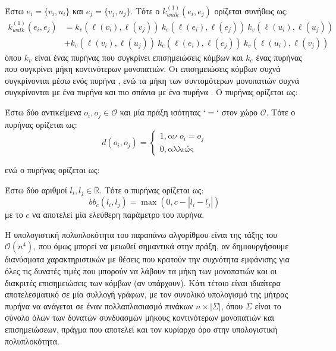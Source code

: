 Έστω $e_i = \{v_i, u_i\}$ και $e_j = \{v_j, u_j\}$.
Τότε ο $k_{walk}^{(1)}(e_i, e_j)$ ορίζεται συνήθως ως:
\begin{equation}
\begin{split}
	k_{walk}^{(1)}(e_i, e_j) &= k_v(\ell(v_i),\ell(v_j)) \ k_e(\ell(e_i),\ell(e_j)) \ k_v(\ell(u_i),\ell(u_j)) \\
	&+ k_v(\ell(v_i),\ell(u_j)) \ k_e(\ell(e_i),\ell(e_j)) \ k_v(\ell(u_i),\ell(v_j))
\end{split}
\end{equation}
όπου $k_v$ είναι ένας πυρήνας που συγκρίνει επισημειώσεις κόμβων και $k_e$ ένας πυρήνας που συγκρίνει μήκη κοντινότερων μονοπατιών.
Οι επισημειώσεις κόμβων συχνά συγκρίνονται μέσω ενός πυρήνα , ενώ τα μήκη των συντομότερων μονοπατιών συχνά συγκρίνονται με ένα πυρήνα  και πιο σπάνια με ένα πυρήνα  \cite{borgwardt2005shortest}.
Ο πυρήνας  ορίζεται ως:
\begin{definition}
	Έστω δύο αντικείμενα $o_{i}, ο_{j} \in \mathcal{O}$ και μία πράξη ισότητας `$=$` στον χώρο $\mathcal{O}$.
	Τότε ο πυρήνας  ορίζεται ως:
	$$
	d(o_{i}, o_{j}) =  \begin{cases}
	1, \text{αν} \;o_{i} = o_{j}\\
	0, \text{αλλιώς}
	\end{cases}
	$$
	\label{def:dirac}
\end{definition}
ενώ ο πυρήνας  ορίζεται ως:
\begin{definition}
	Έστω δύο αριθμοί $l_{i}, l_{j} \in \mathbb{R}$.
	Τότε ο πυρήνας  ορίζεται ως:
    $$bb_{c}(l_{i}, l_{j}) = \max(0, c - |l_{i} - l_{j}|)$$
    με το $c$ να αποτελεί μία ελεύθερη παράμετρο του πυρήνα.
\end{definition}
Η υπολογιστική πολυπλοκότητα του παραπάνω αλγορίθμου είναι της τάξης του $\mathcal{O}(n^4)$, που όμως μπορεί να μειωθεί σημαντικά στην πράξη, αν δημιουργήσουμε διανύσματα χαρακτηριστικών με θέσεις που κρατούν την συχνότητα εμφάνισης για όλες τις δυνατές τιμές που μπορούν να λάβουν τα μήκη των μονοπατιών και οι διακριτές επισημειώσεις των κόμβων (αν υπάρχουν).
Κάτι τέτοιο είναι ιδιαίτερα αποτελεσματικό σε μία συλλογή γράφων, με τον συνολικό υπολογισμό της μήτρας πυρήνα να ανάγεται σε έναν πολλαπλασιασμό πινάκων $n \times |\Sigma|$, όπου $\Sigma$ είναι το σύνολο όλων των δυνατών συνδυασμών μήκους κοντινότερων μονοπατιών και επισημειώσεων, πράγμα που αποτελεί και τον κυρίαρχο όρο στην υπολογιστική πολυπλοκότητα.

